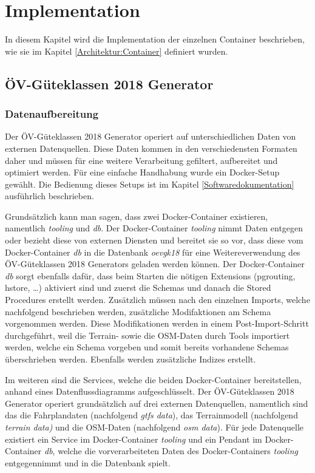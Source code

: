 
\section{Implementation}
\label{Implementation}

In diesem Kapitel wird die Implementation der einzelnen Container beschrieben, wie sie im Kapitel \ref{Architektur:Container} definiert wurden.

\subsection{ÖV-Güteklassen 2018 Generator}
\label{Implementation:ÖV-Güteklassen 2018 Generator}

\subsubsection{Datenaufbereitung}
\label{ÖV-Güteklassen 2018 Generator:Datenaufbereitung}

Der \gls{ÖV-Güteklassen} 2018 Generator operiert auf unterschiedlichen Daten von externen Datenquellen.
Diese Daten kommen in den verschiedensten Formaten daher und müssen für eine weitere Verarbeitung gefiltert, aufbereitet und optimiert werden.
Für eine einfache Handhabung wurde ein Docker-Setup gewählt.
Die Bedienung dieses Setups ist im Kapitel \ref{Softwaredokumentation} ausführlich beschrieben.

Grundsätzlich kann man sagen, dass zwei Docker-Container existieren, namentlich \emph{tooling} und \emph{db}.
Der Docker-Container \emph{tooling} nimmt Daten entgegen oder bezieht diese von externen Diensten und bereitet sie so vor, dass diese vom Docker-Container \emph{db} in die Datenbank \emph{oevgk18} für eine Weitereverwendung des \gls{ÖV-Güteklassen} 2018 Generators geladen werden können.
Der Docker-Container \emph{db} sorgt ebenfalls dafür, dass beim Starten die nötigen Extensions (pgrouting, hstore, \dots) aktiviert sind und zuerst die Schemas und danach die \glspl{Stored Procedure} erstellt werden.
Zusätzlich müssen nach den einzelnen Imports, welche nachfolgend beschrieben werden, zusätzliche Modifaktionen am Schema vorgenommen werden.
Diese Modifikationen werden in einem Post-Import-Schritt durchgeführt, weil die Terrain- sowie die \acs{OSM}-Daten durch Tools importiert werden, welche ein Schema vorgeben und somit bereits vorhandene Schemas überschrieben werden.
Ebenfalls werden zusätzliche Indizes erstellt.

Im weiteren sind die Services, welche die beiden Docker-Container bereitstellen, anhand eines Datenflussdiagramms aufgeschlüsselt.
Der \gls{ÖV-Güteklassen} 2018 Generator operiert grundsätzlich auf drei externen Datenquellen, namentlich sind das die Fahrplandaten (nachfolgend \emph{gtfs data}), das \gls{Terrainmodell} (nachfolgend \emph{terrain data)} und die \acs{OSM}-Daten (nachfolgend \emph{osm data}).
Für jede Datenquelle existiert ein Service im Docker-Container \emph{tooling} und ein Pendant im Docker-Container \emph{db}, welche die vorverarbeiteten Daten des Docker-Containers \emph{tooling} entgegennimmt und in die Datenbank spielt.

